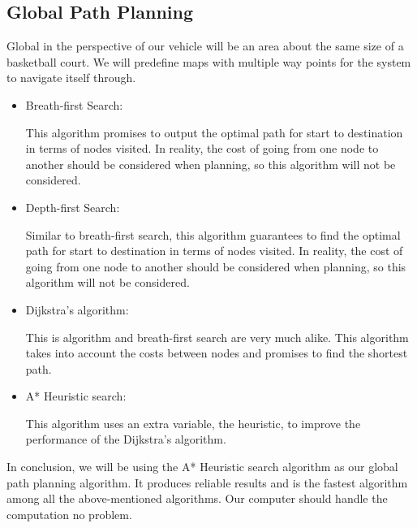 \documentclass[compsoc,draftclsnofoot,onecolumn,10pt]{IEEEtran}
\begin{document}
\subsection{Global Path Planning}
Global in the perspective of our vehicle will be an area about the same size of a 
basketball court. We will predefine maps with multiple way points for the system to 
navigate itself through.\par
\begin{itemize}
\item Breath-first Search:\par
This algorithm promises to output the optimal path for start to destination in terms 
of nodes visited. In reality, the cost of going from one node to another should be 
considered when planning, so this algorithm will not be considered. 
\item Depth-first Search:\par
Similar to breath-first search, this algorithm guarantees to find the optimal path 
for start to destination in terms of nodes visited. In reality, the cost of going 
from one node to another should be considered when planning, so this algorithm will 
not be considered. 
\item Dijkstra's algorithm:\par
This is algorithm and breath-first search are very much alike. This algorithm takes 
into account the costs between nodes and promises to find the shortest path.
\item A* Heuristic search:\par
This algorithm uses an extra variable, the heuristic, to improve the performance 
of the Dijkstra's algorithm. 
\end{itemize}
In conclusion, we will be using the A* Heuristic search algorithm as our global 
path planning algorithm. It produces reliable results and is the fastest algorithm 
among all the above-mentioned algorithms. Our computer should handle the computation 
no problem.\par  
\end{document}
